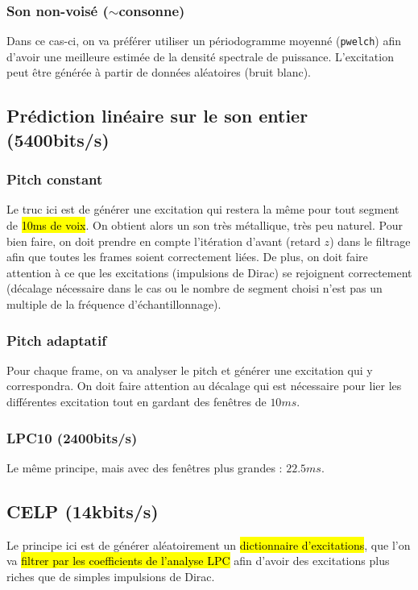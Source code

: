 \documentclass[letterpaper, 12pt]{article}
\newcommand{\alinea}{
\hspace*{0.5cm}}
\begin{document}
			\subsubsection*{Son non-voisé ($\sim$consonne)}	
				\alinea Dans ce cas-ci, on va préférer utiliser un périodogramme moyenné (\texttt{pwelch}) afin d'avoir une 
					meilleure estimée de la densité spectrale de puissance. L'excitation peut être générée à partir de 
					données aléatoires (bruit blanc).
		\subsection{Prédiction linéaire sur le son entier (5400bits/s)}
			\subsubsection*{Pitch constant}
				\alinea Le truc ici est de générer une excitation qui restera la même pour tout segment de \hl{10ms de voix}.
					On obtient alors un son très métallique, très peu naturel. Pour bien faire, on doit prendre en 
					compte l'itération d'avant (retard $z$) dans le filtrage afin que toutes les frames soient correctement liées.
					De plus, on doit faire attention à ce que les excitations (impulsions de Dirac) 
					se rejoignent correctement (décalage nécessaire dans le cas
					ou le nombre de segment choisi n'est pas un multiple de la fréquence d'échantillonnage).
			\subsubsection*{Pitch adaptatif}
				\alinea Pour chaque frame, on va analyser le pitch et générer une excitation qui y correspondra. On doit faire
					attention au décalage qui est nécessaire pour lier les différentes excitation tout en gardant des fenêtres de 
					$10ms$.
			\subsubsection*{LPC10 (2400bits/s)}
				\alinea Le même principe, mais avec des fenêtres plus grandes : $22.5ms$.
		\subsection{CELP (14kbits/s)}
			\alinea Le principe ici est de générer aléatoirement un \hl{dictionnaire d'excitations}, que l'on va \hl{filtrer par les
				coefficients de l'analyse LPC} afin d'avoir des excitations plus riches que de simples impulsions de Dirac.
\end{document}
